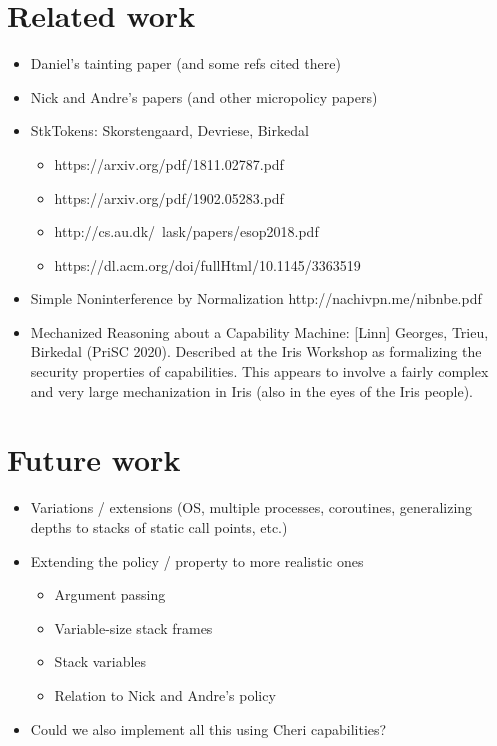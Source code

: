 \documentclass[conference]{IEEEtran}
\begin{document}
\section{Related work}

\begin{itemize}
\item Daniel's tainting paper (and some refs cited there)
\item Nick and Andre's papers (and other micropolicy papers)
\item StkTokens: Skorstengaard, Devriese, Birkedal
\begin{itemize}
\item {https://arxiv.org/pdf/1811.02787.pdf}
\item {https://arxiv.org/pdf/1902.05283.pdf}
\item {http://cs.au.dk/~lask/papers/esop2018.pdf}
\item {https://dl.acm.org/doi/fullHtml/10.1145/3363519}
\end{itemize}

\item Simple Noninterference by Normalization {http://nachivpn.me/nibnbe.pdf}

\item Mechanized Reasoning about a Capability Machine: [Linn] Georges,
Trieu, Birkedal (PriSC 2020).
%
Described at the Iris Workshop as formalizing the security properties of
capabilities. This appears to involve a fairly complex and very large
mechanization in Iris (also in the eyes of the Iris people).
\end{itemize}

\iftext
\section{Future work}

\begin{itemize}
\item Variations / extensions (OS, multiple processes, coroutines, generalizing depths to stacks of static call points, etc.)
\item Extending the policy / property to more realistic ones
\begin{itemize}
\item Argument passing
\item Variable-size stack frames
\item Stack variables
\item Relation to Nick and Andre’s policy
\end{itemize}
\item Could we also implement all this using Cheri capabilities?
\end{itemize}
\end{document}
